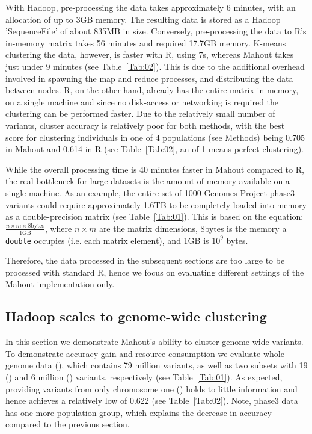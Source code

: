 \documentclass{bioinfo}
\begin{document}
With Hadoop, pre-processing the data takes approximately 6 minutes, with an allocation of up to 3GB memory. 
The resulting data is stored as a Hadoop 'SequenceFile' of about 835MB in size.
Conversely,  pre-processing the data to R's in-memory matrix takes 56 minutes and required 17.7GB memory. 
K-means clustering the data, however, is faster with R, using 7s, whereas Mahout takes just under 9 minutes (see Table~\ref{Tab:02}). 
This is due to the additional overhead involved in spawning the map and reduce processes, and distributing the data between nodes.
R, on the other hand, already has the entire matrix in-memory, on a single machine and since no disk-access or networking is required the clustering can be performed faster. 
Due to the relatively small number of variants, cluster accuracy is relatively poor for both methods, with the best \ARI{}~\citep{Hubert1985} score for clustering individuals in one of 4 populations (see Methods) being 0.705 in Mahout and 0.614 in R (see Table~\ref{Tab:02}, an \ARI{} of 1 means perfect clustering).

While the overall processing time is 40 minutes faster in Mahout compared to R, the real bottleneck for large datasets is the amount of memory available on a single machine. 
As an example, the entire set of 1000 Genomes Project phase3 variants could require approximately 1.6TB to be completely loaded into memory as a double-precision matrix (see Table~\ref{Tab:01}). This is based on the equation:
$\frac{n \times m \times 8\text{bytes}}{1\text{GB}}$, where $n \times m$ are the matrix dimensions, 8bytes is the memory a \texttt{double} occupies (i.e. each matrix element), and  1GB is $10^9$ bytes.

Therefore, the data processed in the subsequent sections are too large to be processed with standard R, hence we focus on evaluating different settings of the Mahout implementation only.  



\subsection*{Hadoop scales to genome-wide clustering}
In this section we demonstrate Mahout's ability to cluster genome-wide variants. 
To demonstrate accuracy-gain and resource-consumption we evaluate whole-genome data (\FullPhasethree{}), which contains 79 million variants, as well as two subsets with 19 (\ThreePhasethree{}) and 6 million (\OnePhasethree{}) variants, respectively  (see Table~\ref{Tab:01}).  
As expected, providing variants from only chromosome one (\OnePhasethree{}) holds to little information and hence achieves a relatively low \ARI{} of 0.622 (see Table~\ref{Tab:02}).
Note, phase3 data has one more population group, which explains the decrease in accuracy compared to the previous section.  
\end{document}
